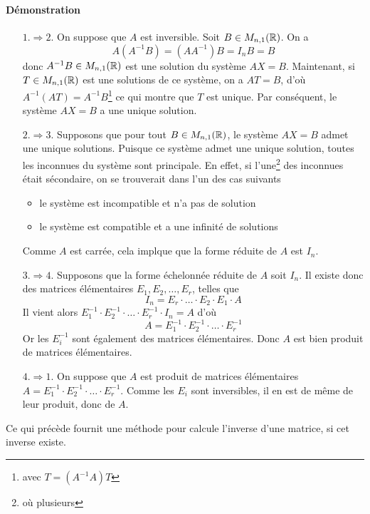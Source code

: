 \paragraph{Démonstration}
\begin{itemize}
  \item[$1. \Rightarrow 2.$] On suppose que $A$ est inversible. Soit $B \in M_{n, 1}(\mathbb{R})$. On a
    $$A (A^{-1} B) = (A A^{-1}) B = I_n B = B$$
    donc $A^{-1} B \in M_{n, 1}(\mathbb{R})$ est une solution du système $A X = B$. Maintenant, si $T \in M_{n, 1}(\mathbb{R})$ est une solutions de ce système, on a $A T = B$, d'où $A^{-1}(A T) = A^{-1} B$\footnote{avec $T = (A^{-1} A) T$} ce qui montre que $T$ est unique. Par conséquent, le système $A X = B$ a une unique solution.
    
  \item[$2. \Rightarrow 3.$] Supposons que pour tout $B \in M_{n, 1}(\mathbb{R})$, le système $A X = B$ admet une unique solutions. Puisque ce système admet une unique solution, toutes les inconnues du système sont principale. En effet, si l'une\footnote{où plusieurs} des inconnues était sécondaire, on se trouverait dans l'un des cas suivants
    \begin{itemize}
      \item le système est incompatible et n'a pas de solution
      \item le système est compatible et a une infinité de solutions
    \end{itemize}
    Comme $A$ est carrée, cela implque que la forme réduite de $A$ est $I_n$.
    
  \item[$3. \Rightarrow 4.$] Supposons que la forme échelonnée réduite de $A$ soit $I_n$. Il existe donc des matrices élémentaires $E_1, E_2, \ldots , E_r$, telles que
    $$I_n = E_r \cdot \ldots \cdot E_2 \cdot E_1 \cdot A$$
    Il vient alors $E_1^{-1} \cdot E_2^{-1} \cdot \ldots \cdot E_r^{-1} \cdot I_n = A$ d'où
    $$A = E_1^{-1} \cdot E_2^{-1} \cdot \ldots \cdot E_r^{-1}$$
    Or les $E_i^{-1}$ sont également des matrices élémentaires. Donc $A$ est bien produit de matrices élémentaires.
    
  \item[$4. \Rightarrow 1.$] On suppose que $A$ est produit de matrices élémentaires $A = E_1^{-1} \cdot E_2^{-1} \cdot \ldots \cdot E_r^{-1}$. Comme les $E_i$ sont inversibles, il en est de même de leur produit, donc de $A$.
\end{itemize}
Ce qui précède fournit une méthode pour calcule l'inverse d'une matrice, si cet inverse existe.

